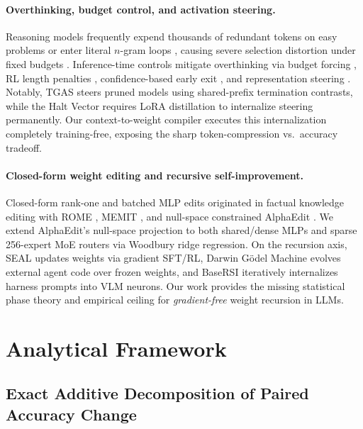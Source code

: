 \documentclass[10pt]{article}
\begin{document}
\paragraph{Overthinking, budget control, and activation steering.}
Reasoning models frequently expend thousands of redundant tokens on easy problems \citep{chen2025overthinking} or enter literal $n$-gram loops \citep{pipis2026loop}, causing severe selection distortion under fixed budgets \citep{zhou2026conserved,kaiser2026beyond,nie2026coupling}. Inference-time controls mitigate overthinking via budget forcing \citep{muennighoff2025s1}, RL length penalties \citep{aggarwal2025l1}, confidence-based early exit \citep{yang2026deer}, and representation steering \citep{zou2023repe,arditi2024refusal,sun2025thinkedit,eisenstadt2025overclocking,lin2025speed,nguyen2026stop,jayabahu2026halt}. Notably, TGAS \citep{nguyen2026stop} steers pruned models using shared-prefix termination contrasts, while the Halt Vector \citep{jayabahu2026halt} requires LoRA distillation to internalize steering permanently. Our context-to-weight compiler executes this internalization completely training-free, exposing the sharp token-compression vs.\ accuracy tradeoff.

\paragraph{Closed-form weight editing and recursive self-improvement.}
Closed-form rank-one and batched MLP edits originated in factual knowledge editing with ROME \citep{meng2022locating}, MEMIT \citep{meng2023memit}, and null-space constrained AlphaEdit \citep{fang2025alphaedit}. We extend AlphaEdit's null-space projection to both shared/dense MLPs and sparse 256-expert MoE routers via Woodbury ridge regression. On the recursion axis, SEAL \citep{zweiger2025selfadapting} updates weights via gradient SFT/RL, Darwin G\"odel Machine \citep{zhang2025darwin} evolves external agent code over frozen weights, and BaseRSI \citep{zhang2026basersi} iteratively internalizes harness prompts into VLM neurons. Our work provides the missing statistical phase theory and empirical ceiling for \emph{gradient-free} weight recursion in LLMs.

\section{Analytical Framework}
\label{sec:framework}

\subsection{Exact Additive Decomposition of Paired Accuracy Change}
\label{sec:decomp}
\end{document}

